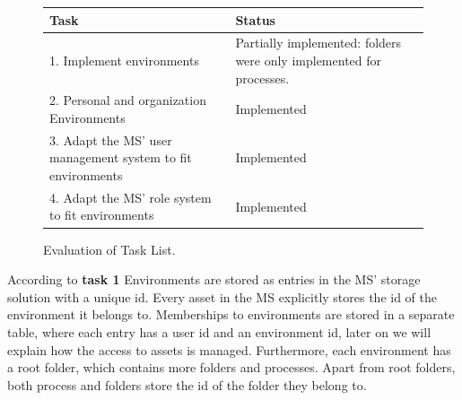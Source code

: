 \begin{figure}[H]
	\centering

	\begin{tabular}{ | m{20em} | m{17em}| }
		\hline
		 Task & Status \\
     \hline
      1. Implement environments &  Partially implemented: folders were only implemented for processes. \\
     \hline
      2. Personal and organization Environments &  Implemented \\
     \hline
      3. Adapt the MS' user management system to fit environments &  Implemented \\
     \hline
      4. Adapt the MS' role system to fit environments &  Implemented \\
     \hline
	\end{tabular}

	\caption{Evaluation of Task List.}
	\label{fig:task-list-functional-quick-evaluation}
\end{figure}

According to \textbf{task 1} Environments are stored as entries in the MS' storage
solution with a unique id.
Every asset in the MS explicitly stores the id of the environment it belongs to.
Memberships to environments are stored in a separate table, where each entry has a user id
and an environment id,
later on we will explain how the access to assets is managed.
Furthermore, each environment has a root folder, which contains more folders and
processes.
Apart from root folders, both process and folders store the id of the folder they belong
to.

